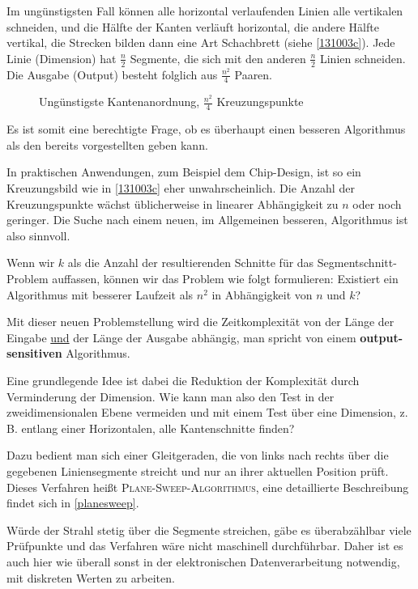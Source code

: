 \documentclass[ngerman,draft,parskip=half*,twoside]{scrreprt}
\theoremstyle{break}
\begin{document}
Im ungünstigsten Fall können alle horizontal verlaufenden Linien
alle vertikalen schneiden, und die Hälfte der Kanten verläuft
horizontal, die andere Hälfte vertikal, die Strecken bilden dann eine
Art Schachbrett (siehe \autoref{131003c}). Jede Linie (Dimension) hat $\frac{n}{2}$ Segmente,
die sich mit den anderen $\frac{n}{2}$ Linien schneiden.  Die Ausgabe
(Output) besteht folglich aus $\frac{n^2}{4}$ Paaren. 

\begin{figure}
  \centering
%  
  \caption{Ungünstigste Kantenanordnung, $\frac{n^2}{4}$ Kreuzungspunkte}
  \label{131003c}
\end{figure}

Es ist somit eine berechtigte Frage, ob es überhaupt einen besseren
Algorithmus als den bereits vorgestellten geben kann.

In praktischen Anwendungen, zum Beispiel dem Chip-Design, ist so ein
Kreuzungsbild wie in \autoref{131003c} eher unwahrscheinlich. Die
Anzahl der Kreuzungspunkte wächst üblicherweise in linearer
Abhängigkeit zu $n$ oder noch geringer. Die Suche nach einem neuen, im
Allgemeinen besseren, Algorithmus ist also sinnvoll.

Wenn wir $k$ als die Anzahl der resultierenden Schnitte für das
Segmentschnitt-Problem auffassen, können wir das Problem wie folgt
formulieren: Existiert ein Algorithmus mit besserer Laufzeit als $n^2$ in 
Abhängigkeit von $n$ und $k$?

Mit dieser neuen Problemstellung wird die Zeitkomplexität von der Länge
der Eingabe \underline{und} der Länge der Ausgabe abhängig, man spricht
von einem \textbf{output-sensitiven} Algorithmus.

Eine grundlegende Idee ist dabei die Reduktion der Komplexität durch
Verminderung der Dimension. Wie kann man also den Test in der
zweidimensionalen Ebene vermeiden und mit einem Test über eine
Dimension, z.\,B. entlang einer Horizontalen, alle Kantenschnitte
finden?

Dazu bedient man sich einer Gleitgeraden, die von links nach rechts
über die gegebenen Liniensegmente streicht und nur an ihrer aktuellen
Position prüft. Dieses Verfahren heißt \textsc{Plane-Sweep-Algorithmus},
eine detaillierte Beschreibung findet sich in \autoref{planesweep}.

Würde der Strahl stetig über die Segmente streichen, gäbe es
überabzählbar viele Prüfpunkte und das Verfahren wäre nicht maschinell
durchführbar. Daher ist es auch hier wie überall sonst in der
elektronischen Datenverarbeitung notwendig, mit diskreten Werten zu
arbeiten.
 
\end{document}
